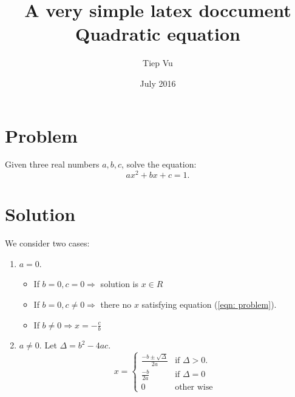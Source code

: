 \documentclass[10pt]{article}
\title{A very simple latex doccument \\
\textbf{Quadratic equation}}
\author{Tiep Vu}
\date{July 2016}
\begin{document}
\maketitle

\section{Problem} %
\label{sec:problem}
	Given three real numbers $a, b, c$, solve the equation: 
	\begin{equation}
	\label{eqn: problem}
	    ax^2 + bx + c = 1.
	\end{equation}

\section{Solution} %
\label{sec:solution}
We consider two cases: 
\begin{enumerate}
	\item $a = 0$.
	\begin{itemize}
		\item If $ b = 0, c = 0 \Rightarrow$ solution is $x \in R$ 

		\item If $ b = 0, c \neq 0 \Rightarrow$ there no $x$ satisfying equation 
		(\ref{eqn: problem}). 

		\item If $\displaystyle b \neq 0 \Rightarrow x = -\frac{c}{b}$
	\end{itemize}
	\item $a \neq 0$. Let $\Delta = b^2 - 4ac.$
	\begin{equation}
	\label{eqn:solution}
		\displaystyle
	    x = \left\{
	    	\begin{array} {cl}	    		
	    		\displaystyle \frac{-b \pm \sqrt{\Delta}}{2a} & \text{if~} \Delta > 0. \\
	    		\displaystyle \frac{-b}{2a}                   & \text{if~} \Delta = 0 \\
	    		\displaystyle 0                               & \text{other wise}
	    	\end{array}
		    \right. 	
	\end{equation}
\end{enumerate}
\end{document}
